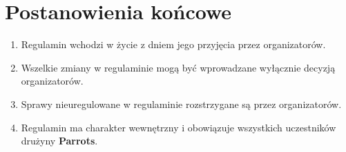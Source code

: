 \documentclass[12pt,a4paper]{article}
\let\stdsection\section
\renewcommand\section{\clearpage\stdsection}
\begin{document}
\section{Postanowienia końcowe}
\begin{enumerate}
  \item Regulamin wchodzi w życie z dniem jego przyjęcia przez organizatorów.
  \item Wszelkie zmiany w regulaminie mogą być wprowadzane wyłącznie decyzją organizatorów.
  \item Sprawy nieuregulowane w regulaminie rozstrzygane są przez organizatorów.
  \item Regulamin ma charakter wewnętrzny i obowiązuje wszystkich uczestników drużyny \textbf{Parrots}.
\end{enumerate}
\end{document}
